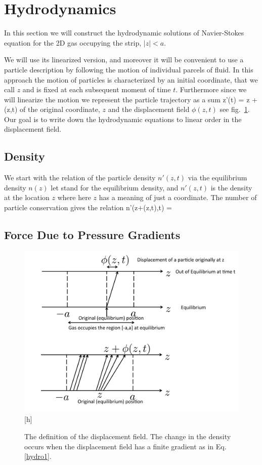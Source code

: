 \section{Hydrodynamics}

In this section we will construct the hydrodynamic solutions of Navier-Stokes equation for the 2D gas occupying the strip, $|z|< a$.


We will use its linearized version, and moreover it will be convenient to use a particle description by following the motion of individual parcels of fluid. 
In this approach the motion of particles is characterized by an initial coordinate, that we call $z$ and is fixed at each subsequent moment of time $t$.
Furthermore since we will linearize the motion we represent the particle trajectory as a sum  
\be
z'(t) = z + \phi(z,t)
\ee
of the original coordinate, $z$ and the displacement field $\phi(z,t)$ see fig.~\ref{displace}.
Our goal is to write down the hydrodynamic equations to linear order in the displacement field.

\subsection{Density}

We start with the relation of the particle density $n'(z,t)$ via the equilibrium density $n(z)$
let  stand for the equilibrium density, and $n'(z,t)$ is the density at the location $z$ where here $z$ has a meaning of just a coordinate.
The number of particle conservation gives the relation
\be\label{hydro1}
n'(z+\phi(z,t),t) = 
\ee

\subsection{Force Due to Pressure Gradients}

\begin{figure}
\begin{flushright}
\includegraphics[width=0.8\columnwidth]{displacement.pdf}[h]
\caption{The definition of the displacement field.
The change in the density occurs when the displacement field has a finite gradient as in Eq. \eqref{hydro1}.}
\label{displace}
\end{flushright}
\end{figure}

